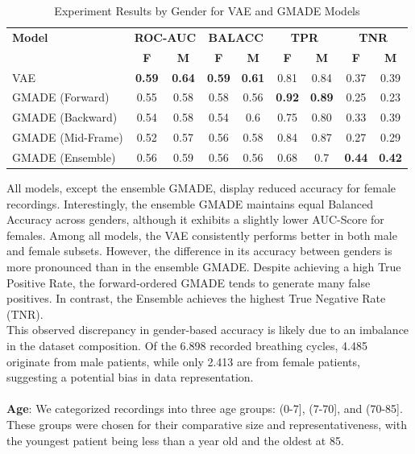 \begin{table}[h!]
    \centering
    \caption{Experiment Results by Gender for VAE and GMADE Models}
    \begin{tabular}{|l||c|c||c|c||c|c||c|c|}
    \hline
    \textbf{Model} & \multicolumn{2}{c||}{\textbf{ROC-AUC}} & \multicolumn{2}{c||}{\textbf{BALACC}} & \multicolumn{2}{c||}{\textbf{TPR}} & \multicolumn{2}{c|}{\textbf{TNR}} \\
    \cline{2-9}
    & \textbf{F} & \textbf{M} & \textbf{F} & \textbf{M} & \textbf{F} & \textbf{M} & \textbf{F} & \textbf{M} \\
    \hline
    VAE & \textbf{0.59} & \textbf{0.64} & \textbf{0.59} & \textbf{0.61} & 0.81 & 0.84 & 0.37 & 0.39 \\
    GMADE (Forward) & 0.55 & 0.58 & 0.58 & 0.56 & \textbf{0.92} & \textbf{0.89} & 0.25 & 0.23 \\
    GMADE (Backward) & 0.54 & 0.58 & 0.54 & 0.6 & 0.75 & 0.80 & 0.33 & 0.39 \\
    GMADE (Mid-Frame) & 0.52 & 0.57 & 0.56 & 0.58 & 0.84 & 0.87 & 0.27 & 0.29 \\
    GMADE (Ensemble) & 0.56 & 0.59 & 0.56 & 0.56 & 0.68 & 0.7 & \textbf{0.44} & \textbf{0.42} \\
    \hline
    \end{tabular}
\end{table}
All models, except the ensemble GMADE, display reduced accuracy for female recordings. Interestingly, the ensemble GMADE maintains equal Balanced Accuracy across genders, although it exhibits a slightly lower AUC-Score for females. Among all models, the VAE consistently performs better in both male and female subsets. However, the difference in its accuracy between genders is more pronounced than in the ensemble GMADE. Despite achieving a high True Positive Rate, the forward-ordered GMADE tends to generate many false positives. In contrast, the Ensemble achieves the highest True Negative Rate (TNR).\\
This observed discrepancy in gender-based accuracy is likely due to an imbalance in the dataset composition. Of the 6.898 recorded breathing cycles, 4.485 originate from male patients, while only 2.413 are from female patients, suggesting a potential bias in data representation.\\\\
\textbf{Age}: We categorized recordings into three age groups: (0-7], (7-70], and (70-85]. These groups were chosen for their comparative size and representativeness, with the youngest patient being less than a year old and the oldest at 85.


